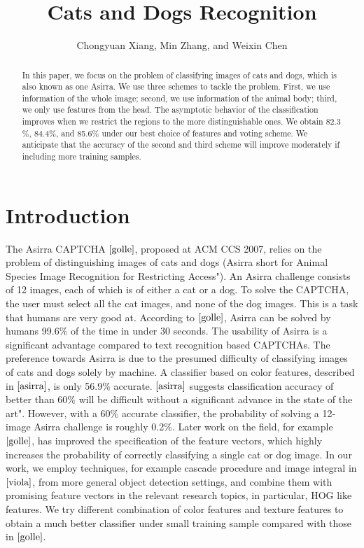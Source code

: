 \documentclass[12pt]{article}
\title{Cats and Dogs Recognition}
\author{Chongyuan Xiang, Min Zhang, and Weixin Chen}
\begin{document}
\maketitle
\begin{abstract}
In this paper, we focus on the problem of classifying images of cats and dogs, which is also known as one Asirra. We use three schemes to tackle the problem. First, we use information of the whole image; second, we use information of the animal body; third, we only use features from the head. The asymptotic behavior of the classification improves when we restrict the regions to the more distinguishable ones. We obtain 82.3$\%$, 84.4$\%$, and 85.6$\%$ under our best choice of features and voting scheme.  We anticipate that the accuracy of the second and third scheme will improve moderately if including more training samples.    
\end{abstract}


\section{Introduction}
The Asirra CAPTCHA $\cite{golle}$, proposed at ACM CCS 2007, relies on the problem of distinguishing images of cats and dogs (Asirra short for Animal Species Image Recognition for Restricting Access"). An Asirra challenge consists of 12 images, each of which is of either a cat or a dog. To solve the CAPTCHA, the user must select all the cat images, and none of the dog images. This is a task that humans are very good at. According to $\cite{golle}$, Asirra can be solved by humans 99.6$\%$ of the time in under 30 seconds. The usability of Asirra is a significant advantage compared to text recognition based CAPTCHAs. The preference towards Asirra is due to the presumed difficulty of classifying images of cats and dogs solely by machine. A classifier based on color features, described in $\cite{asirra}$, is only 56.9$\%$ accurate. $\cite{asirra}$ suggests classification accuracy of better than 60$\%$ will be difficult without a significant advance in the state of the art". However, with a 60$\%$ accurate classifier, the probability of solving a 12-image Asirra challenge is roughly 0.2$\%$. Later work on the field, for example $\cite{golle}$, has improved the specification of the feature vectors, which highly increases the probability of correctly classifying a single cat or dog image. In our work, we employ techniques, for example cascade procedure and image integral in $\cite{viola}$, from more general object detection settings, and combine them with promising feature vectors in the relevant research topics, in particular, HOG like features. We try different combination of color features and texture features to obtain a much better classifier under small training sample compared with those in $\cite{golle}$.
\end{document}
